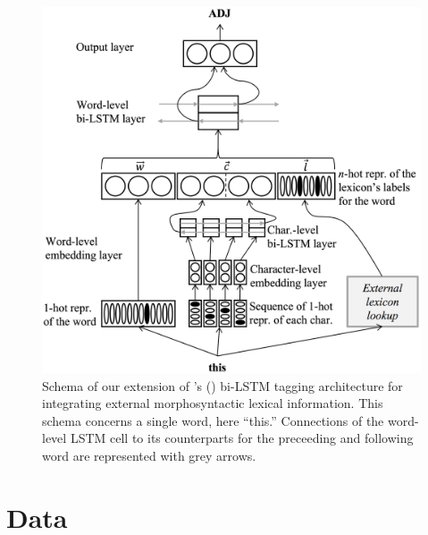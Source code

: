 \documentclass[11pt,a4paper]{article}
\begin{document}
\begin{figure}
\includegraphics[width=\columnwidth]{emnlp17schemaB2}
\caption{Schema of our extension of \citeauthor{plank16}'s (\citeyear{plank16})
  bi-LSTM tagging architecture for integrating external morphosyntactic lexical information. This schema concerns a
  single word, here ``this.'' Connections of the word-level LSTM cell to its counterparts for the preceeding and
  following word are represented with grey arrows.}\label{fig:schema}
\end{figure}


\section{Data}
\end{document}
